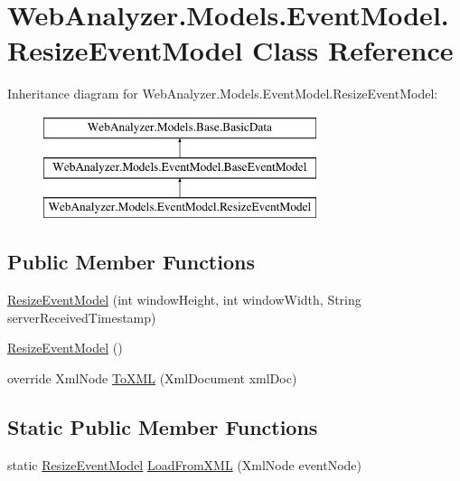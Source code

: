 \hypertarget{class_web_analyzer_1_1_models_1_1_event_model_1_1_resize_event_model}{}\section{Web\+Analyzer.\+Models.\+Event\+Model.\+Resize\+Event\+Model Class Reference}
\label{class_web_analyzer_1_1_models_1_1_event_model_1_1_resize_event_model}
Inheritance diagram for Web\+Analyzer.\+Models.\+Event\+Model.\+Resize\+Event\+Model\+:\begin{figure}[H]
\begin{center}
\leavevmode
\includegraphics[height=3.000000cm]{class_web_analyzer_1_1_models_1_1_event_model_1_1_resize_event_model}
\end{center}
\end{figure}
\subsection*{Public Member Functions}
\begin{DoxyCompactItemize}
\item 
\hyperlink{class_web_analyzer_1_1_models_1_1_event_model_1_1_resize_event_model_ae60fbe903d44770db6d6f3999658eca2}{Resize\+Event\+Model} (int window\+Height, int window\+Width, String server\+Received\+Timestamp)
\item 
\hyperlink{class_web_analyzer_1_1_models_1_1_event_model_1_1_resize_event_model_ac851f00528b0f87058e64b64945e464e}{Resize\+Event\+Model} ()
\item 
override Xml\+Node \hyperlink{class_web_analyzer_1_1_models_1_1_event_model_1_1_resize_event_model_a55f5533548b548490cfb7342f075f8e0}{To\+X\+M\+L} (Xml\+Document xml\+Doc)
\end{DoxyCompactItemize}
\subsection*{Static Public Member Functions}
\begin{DoxyCompactItemize}
\item 
static \hyperlink{class_web_analyzer_1_1_models_1_1_event_model_1_1_resize_event_model}{Resize\+Event\+Model} \hyperlink{class_web_analyzer_1_1_models_1_1_event_model_1_1_resize_event_model_a85d357e36f33991ea33642934eb98463}{Load\+From\+X\+M\+L} (Xml\+Node event\+Node)
\end{DoxyCompactItemize}
